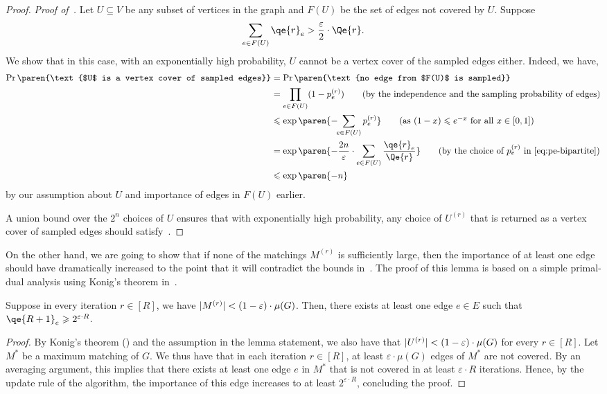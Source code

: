 \documentclass{theoretics}
\renewcommand{\leq}{\leqslant}
\renewcommand{\geq}{\geqslant}
\DeclarePairedDelimiter{\paren}()
\DeclarePairedDelimiter{\card}{\vert}{\vert}
\newcommand{\eps}{\varepsilon}
\begin{document}
\begin{proof}
	\noindent
	\emph{Proof of~.} Let $U \subseteq V$ be any subset of vertices in the graph and $F(U)$ be the set of edges not covered by $U$. 
	Suppose 
	\[
		\sum_{e \in F(U)} \qe{r}_e > \frac{\eps}{2} \cdot \Qe{r}.
	\]
	We show that in this case, with an exponentially high probability, $U$ cannot be a vertex cover of the sampled edges either. Indeed, we have, 
	\begin{align*}
		\Pr\paren{\text{$U$ is a vertex cover of sampled edges}} &= \Pr\paren{\text{no edge from $F(U)$ is sampled}} \\
		&= \prod_{e \in F(U)} (1-p^{(r)}_e) \tag{by the independence and the sampling probability of edges} \\
		&\leq \exp\paren{-\!\!\sum_{e \in F(U)} p^{(r)}_e} \tag{as $(1-x) \leq e^{-x}$ for all $x \in [0,1]$} \\
		&= \exp\paren{-\frac{2n}{\eps} \cdot \sum_{e \in F(U)} \frac{\qe{r}_e}{\Qe{r}}} \tag{by the choice of $p^{(r)}_e$ in~\Cref{eq:pe-bipartite}} \\
		&\leq \exp\paren{-n}
	\end{align*}
	by our assumption about $U$ and importance of edges in $F(U)$ earlier. 
	
	A union bound over the $2^{n}$ choices of $U$ ensures that with exponentially high probability, any choice of  $U^{(r)}$ that is returned as a vertex cover 
	of sampled edges should satisfy~. 
\end{proof}
	
On the other hand, we are going to show that if none of the matchings $M^{(r)}$ is sufficiently large, then the importance of at least one edge should have dramatically increased to the point that it will contradict the bounds in~. 
The proof of this lemma is based on a simple primal-dual analysis using Konig's theorem in~. 

\begin{lemma}\label{lem:Qe-large-bipartite}
	Suppose in every iteration $r \in [R]$, we have $\card{M^{(r)}} < (1-\eps) \cdot \mu(G)$. Then, 
	there exists at least one edge $e \in E$ such that $\qe{R+1}_e \geq 2^{\eps \cdot R}$.  
\end{lemma}
\begin{proof}
	By Konig's theorem () and the assumption in the lemma statement,  we also have that $\card{U^{(r)}} < (1-\eps) \cdot \mu(G)$ for every $r \in [R]$. Let $M^*$ be a maximum matching of $G$. 
	We thus have that in each iteration $r \in [R]$, at least $\eps \cdot \mu(G)$ edges of $M^*$ are not covered. By an averaging argument, this implies that there exists at least one edge $e$ in $M^*$ that is not
	covered in at least $\eps \cdot R$ iterations. Hence, by the update rule of the algorithm, the importance of this edge increases to at least $2^{\eps \cdot R}$, concluding the proof. 
\end{proof}
\end{document}
